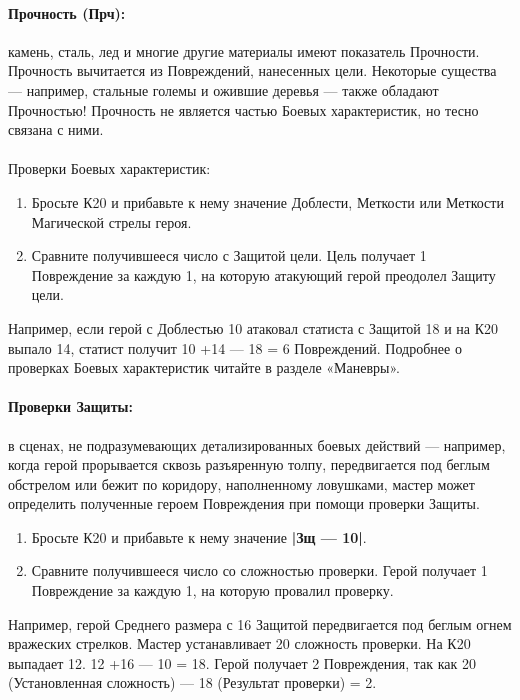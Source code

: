 \paragraph{Прочность (Прч):} камень, сталь, лед и многие другие материалы имеют показатель Прочности. Прочность вычитается из Повреждений, нанесенных цели. Некоторые существа — например, стальные големы и ожившие деревья — также обладают Прочностью! Прочность не является частью Боевых характеристик, но тесно связана с ними.
\paragraph{}Проверки Боевых характеристик:
\begin{enumerate}
\item Бросьте К20 и прибавьте к нему значение Доблести, Меткости или Меткости Магической стрелы героя.
\item Сравните получившееся число с Защитой цели. Цель получает 1 Повреждение за каждую 1, на которую атакующий герой преодолел Защиту цели.
\end{enumerate}
Например, если герой с Доблестью 10 атаковал статиста с Защитой 18 и на К20 выпало 14, статист получит 10 +14 — 18 = 6 Повреждений.
\newline
Подробнее о проверках Боевых характеристик читайте в разделе «Маневры».
\paragraph{Проверки Защиты:} в сценах, не подразумевающих
детализированных боевых действий — например, когда герой
прорывается сквозь разъяренную толпу, передвигается под беглым обстрелом или бежит по коридору, наполненному ловушками, мастер может определить полученные героем Повреждения при помощи проверки Защиты.
\begin{enumerate}
\item Бросьте К20 и прибавьте к нему значение \textbf{|Зщ — 10|}.
\item Сравните получившееся число со сложностью проверки. Герой получает 1 Повреждение за каждую 1, на которую провалил проверку.
\end{enumerate}
Например, герой Среднего размера с 16 Защитой передвигается
под беглым огнем вражеских стрелков. Мастер устанавливает
20 сложность проверки. На К20 выпадает 12. 12 +16 — 10 = 18.
Герой получает 2 Повреждения, так как 20 (Установленная
сложность) — 18 (Результат проверки) = 2.